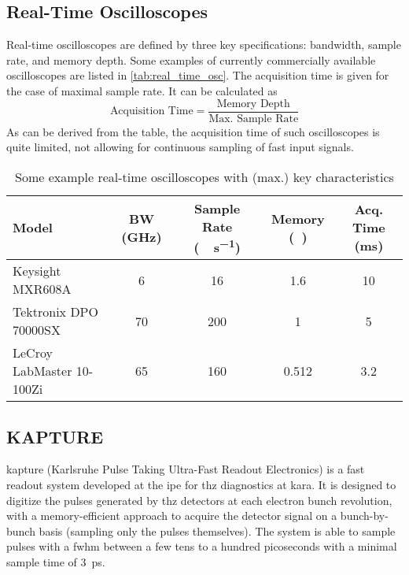\subsection*{Real-Time Oscilloscopes}
Real-time oscilloscopes are defined by three key specifications: bandwidth, sample rate, and memory depth.
Some examples of currently commercially available oscilloscopes are listed in \autoref{tab:real_time_osc}.
The acquisition time is given for the case of maximal sample rate.
It can be calculated as 
\begin{equation}
	\text{Acquisition Time} = \frac{\text{Memory Depth}}{\text{Max. Sample Rate}}
\end{equation}
As can be derived from the table, the acquisition time of such oscilloscopes is quite limited, not allowing for continuous sampling of fast input signals.
\begingroup
\renewcommand{\arraystretch}{1.4}
\begin{table}[tb]
	\caption[Real Time Oscilloscopes Examples]{Some example real-time oscilloscopes with (max.) key characteristics}
	\label{tab:real_time_osc}
	\centering
	\begin{tabularx}{\textwidth}{XSSSS}
		\textbf{Model}            & {\textbf{BW (\si{\GHz})}} & {\textbf{Sample Rate (\si{\giga \sample \per \second})}} & \textbf{{Memory (\si{\giga \sample})}} & {\textbf{Acq. Time (\si{\milli\second})}} \\ \midrule
		Keysight MXR608A          & 6                         & 16                                                       & 1.6                                    & 10                                        \\
		Tektronix DPO 70000SX     & 70                        & 200                                                      & 1                                      & 5                                         \\
		LeCroy LabMaster 10-100Zi & 65                        & 160                                                      & 0.512                                  & 3.2                                       \\ \bottomrule
	\end{tabularx}
\end{table}
\endgroup

\subsection{KAPTURE}
\Gls{kapture} (Karlsruhe Pulse Taking Ultra-Fast Readout Electronics) is a fast readout system developed at the \gls{ipe} for \gls{thz} diagnostics at \gls{kara}. 
It is designed to digitize the pulses generated by \gls{thz} detectors at each electron bunch revolution, with a memory-efficient approach to acquire the detector signal on a bunch-by-bunch basis (sampling only the pulses themselves). 
The system is able to sample pulses with a \gls{fwhm} between a few tens to a hundred picoseconds with a minimal sample time of \SI{3}{\pico \second}. \cite{caselleKAP}

